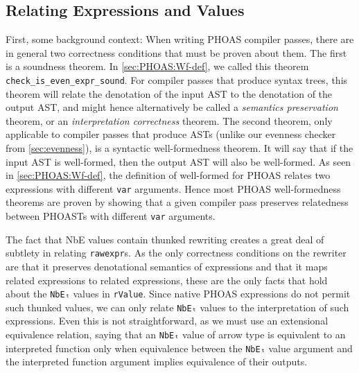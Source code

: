\subsection{Relating Expressions and Values}\label{sec:rewriting-more:values-and-expressions}
First, some background context:
When writing PHOAS compiler passes, there are in general two correctness conditions that must be proven about them.
The first is a soundness theorem.
In \autoref{sec:PHOAS:Wf-def}, we called this theorem \texttt{check_is_even_expr_sound}.
For compiler passes that produce syntax trees, this theorem will relate the denotation of the input AST to the denotation of the output AST, and might hence alternatively be called a \emph{semantics preservation} theorem, or an \emph{interpretation correctness} theorem.
The second theorem, only applicable to compiler passes that produce ASTs (unlike our evenness checker from \autoref{sec:evenness}), is a syntactic well-formedness theorem.
It will say that if the input AST is well-formed, then the output AST will also be well-formed.
As seen in \autoref{sec:PHOAS:Wf-def}, the definition of well-formed for PHOAS relates two expressions with different \texttt{var} arguments.
Hence most PHOAS well-formedness theorems are proven by showing that a given compiler pass preserves relatedness between PHOASTs with different \texttt{var} arguments.

The fact that NbE values contain thunked rewriting creates a great deal of subtlety in relating \texttt{rawexpr}s.
As the only correctness conditions on the rewriter are that it preserves denotational semantics of expressions and that it maps related expressions to related expressions, these are the only facts that hold about the \texttt{NbEₜ} values in \texttt{rValue}.
Since native PHOAS expressions do not permit such thunked values, we can only relate \texttt{NbEₜ} values to the interpretation of such expressions.
Even this is not straightforward, as we must use an extensional equivalence relation, saying that an \texttt{NbEₜ} value of arrow type is equivalent to an interpreted function only when equivalence between the \texttt{NbEₜ} value argument and the interpreted function argument implies equivalence of their outputs.

